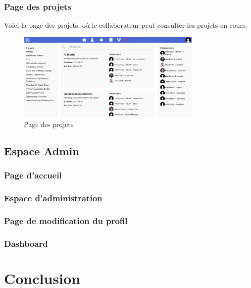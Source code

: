 \documentclass{article}
\begin{document}
                    \FloatBarrier
                \subsubsection{Page des projets}
                    Voici la page des projets, où le collaborateur peut consulter les projets en cours.
                    \begin{figure}[h!]
                        \centering
                        \includegraphics[width=0.8\textwidth]{assets/webSite/projectsPage.png}
                        \caption{Page des projets}
                    \end{figure}
                    \FloatBarrier
    
        \subsection{Espace Admin}
            \subsubsection{Page d'accueil}
            \subsubsection{Espace d'administration}
            \subsubsection{Page de modification du profil}
            \subsubsection{Dashboard}
    \section{Conclusion}
        
\end{document}
